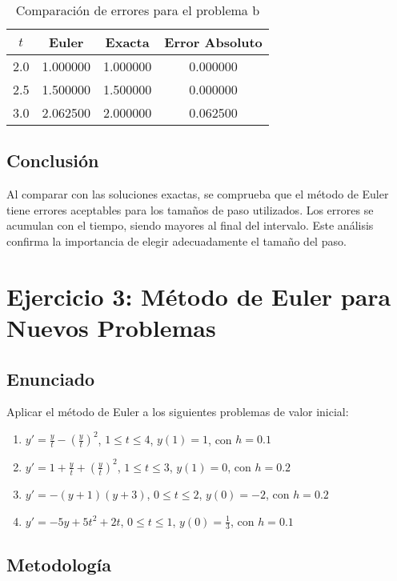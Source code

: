 \documentclass[12pt,a4paper]{article}
\begin{document}
\begin{table}[H]
\centering
\begin{tabular}{cccc}
\toprule
$t$ & Euler & Exacta & Error Absoluto \\
\midrule
2.0 & 1.000000 & 1.000000 & 0.000000 \\
2.5 & 1.500000 & 1.500000 & 0.000000 \\
3.0 & 2.062500 & 2.000000 & 0.062500 \\
\bottomrule
\end{tabular}
\caption{Comparación de errores para el problema b}
\end{table}

\subsection{Conclusión}

Al comparar con las soluciones exactas, se comprueba que el método de Euler tiene errores aceptables para los tamaños de paso utilizados. Los errores se acumulan con el tiempo, siendo mayores al final del intervalo. Este análisis confirma la importancia de elegir adecuadamente el tamaño del paso.

\section{Ejercicio 3: Método de Euler para Nuevos Problemas}

\subsection{Enunciado}

Aplicar el método de Euler a los siguientes problemas de valor inicial:

\begin{enumerate}
    \item $y' = \frac{y}{t} - (\frac{y}{t})^2$, $1 \leq t \leq 4$, $y(1) = 1$, con $h = 0.1$
    \item $y' = 1 + \frac{y}{t} + (\frac{y}{t})^2$, $1 \leq t \leq 3$, $y(1) = 0$, con $h = 0.2$
    \item $y' = -(y + 1)(y + 3)$, $0 \leq t \leq 2$, $y(0) = -2$, con $h = 0.2$
    \item $y' = -5y + 5t^2 + 2t$, $0 \leq t \leq 1$, $y(0) = \frac{1}{3}$, con $h = 0.1$
\end{enumerate}

\subsection{Metodología}
\end{document}
